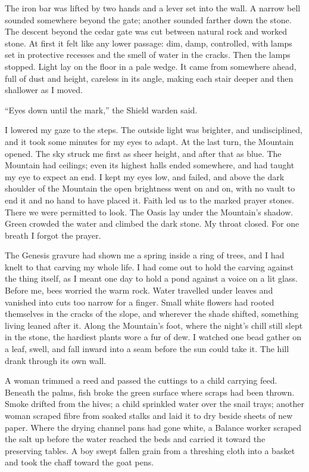 The iron bar was lifted by two hands and a lever set into the wall. A narrow bell sounded somewhere beyond the gate; another sounded farther down the stone. The descent beyond the cedar gate was cut between natural rock and worked stone. At first it felt like any lower passage: dim, damp, controlled, with lamps set in protective recesses and the smell of water in the cracks. Then the lamps stopped. Light lay on the floor in a pale wedge. It came from somewhere ahead, full of dust and height, careless in its angle, making each stair deeper and then shallower as I moved.\par

``Eyes down until the mark,'' the Shield warden said.\par

I lowered my gaze to the steps. The outside light was brighter, and undisciplined, and it took some minutes for my eyes to adapt. At the last turn, the Mountain opened. The sky struck me first as sheer height, and after that as blue. The Mountain had ceilings; even its highest halls ended somewhere, and had taught my eye to expect an end. I kept my eyes low, and failed, and above the dark shoulder of the Mountain the open brightness went on and on, with no vault to end it and no hand to have placed it. Faith led us to the marked prayer stones. There we were permitted to look. The Oasis lay under the Mountain's shadow. Green crowded the water and climbed the dark stone. My throat closed. For one breath I forgot the prayer.

The Genesis gravure had shown me a spring inside a ring of trees, and I had knelt to that carving my whole life. I had come out to hold the carving against the thing itself, as I meant one day to hold a pond against a voice on a lit glass. Before me, bees worried the warm rock. Water travelled under leaves and vanished into cuts too narrow for a finger. Small white flowers had rooted themselves in the cracks of the slope, and wherever the shade shifted, something living leaned after it. Along the Mountain's foot, where the night's chill still slept in the stone, the hardiest plants wore a fur of dew. I watched one bead gather on a leaf, swell, and fall inward into a seam before the sun could take it. The hill drank through its own wall.

A woman trimmed a reed and passed the cuttings to a child carrying feed. Beneath the palms, fish broke the green surface where scraps had been thrown. Smoke drifted from the hives; a child sprinkled water over the snail trays; another woman scraped fibre from soaked stalks and laid it to dry beside sheets of new paper. Where the drying channel pans had gone white, a Balance worker scraped the salt up before the water reached the beds and carried it toward the preserving tables. A boy swept fallen grain from a threshing cloth into a basket and took the chaff toward the goat pens.

